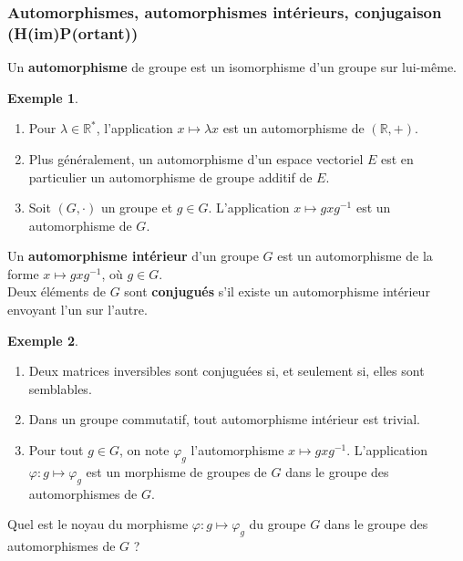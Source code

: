 \documentclass[french]{article}
\newcommand{\R}{\mathbb{R}}
\newcommand{\st}{^*}
\newcommand{\inv}{^{-1}}
\theoremstyle{plain}
\theoremstyle{definition}
\newtheorem*{ex}{Exemple}
\theoremstyle{remark}
\begin{document}
\subsubsection*{Automorphismes, automorphismes intérieurs, conjugaison (H(im)P(ortant))}

\begin{dfn}
	Un \textbf{automorphisme} de groupe est un isomorphisme d'un groupe sur lui-même.
\end{dfn}

\begin{ex}
	\begin{enumerate}
		\item Pour $\lambda\in\R\st$, l'application $x\mapsto\lambda x$ est un automorphisme de $(\R,+)$.
		\item Plus généralement, un automorphisme d'un espace vectoriel $E$ est en particulier un automorphisme de groupe additif de $E$.
		\item Soit $(G,\cdot)$ un groupe et $g\in G$. L'application $x\mapsto g xg\inv$ est un automorphisme de $G$.
	\end{enumerate}
\end{ex}

\begin{dfn}
	Un \textbf{automorphisme intérieur} d'un groupe $G$ est un automorphisme de la forme $x\mapsto gxg\inv$, où $g\in G$.\\
	Deux éléments de $G$ sont \textbf{conjugués} s'il existe un automorphisme intérieur envoyant l'un sur l'autre.
\end{dfn}

\begin{ex}
	\begin{enumerate}
		\item Deux matrices inversibles sont conjuguées si, et seulement si, elles sont semblables.
		\item Dans un groupe commutatif, tout automorphisme intérieur est trivial.
		\item Pour tout $g\in G$, on note $\varphi_g$ l'automorphisme $x\mapsto gxg\inv$. L'application $\varphi:g\mapsto\varphi_g$ est un morphisme de groupes de $G$ dans le groupe des automorphismes de $G$.
	\end{enumerate}
\end{ex}

\begin{exo}
	Quel est le noyau du morphisme $\varphi:g\mapsto\varphi_g$ du groupe $G$ dans le groupe des automorphismes de $G$ ?
\end{exo}
\end{document}
